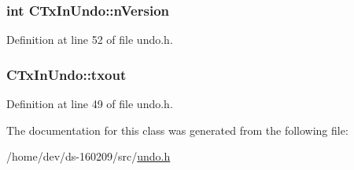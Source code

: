 \subsubsection[{n\+Version}]{\setlength{\rightskip}{0pt plus 5cm}int C\+Tx\+In\+Undo\+::n\+Version}\label{class_c_tx_in_undo_a193281289475ca792e436a7a02de23ef}


Definition at line 52 of file undo.\+h.

\hypertarget{class_c_tx_in_undo_a0eb1374984b5b68b0af14d88d7d4b821}{}
\subsubsection[{txout}]{ C\+Tx\+In\+Undo\+::txout}\label{class_c_tx_in_undo_a0eb1374984b5b68b0af14d88d7d4b821}


Definition at line 49 of file undo.\+h.



The documentation for this class was generated from the following file\+:\begin{DoxyCompactItemize}
\item 
/home/dev/ds-\/160209/src/\hyperlink{undo_8h}{undo.\+h}\end{DoxyCompactItemize}
